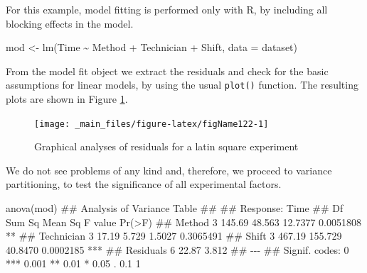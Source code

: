 \documentclass[a4paper,12pt,oneside]{book}
\newenvironment{Shaded}{\begin{snugshade}}{\end{snugshade}}
\newcommand{\SpecialCharTok}[1]{#1}
\newcommand{\DocumentationTok}[1]{#1}
\newcommand{\OtherTok}[1]{#1}
\newcommand{\FunctionTok}[1]{#1}
\newcommand{\AttributeTok}[1]{#1}
\newcommand{\NormalTok}[1]{#1}
\begin{document}
For this example, model fitting is performed only with R, by including all blocking effects in the model.

\begin{Shaded}
\begin{Highlighting}[]
\NormalTok{mod }\OtherTok{\textless{}{-}} \FunctionTok{lm}\NormalTok{(Time }\SpecialCharTok{\textasciitilde{}}\NormalTok{ Method }\SpecialCharTok{+}\NormalTok{ Technician }\SpecialCharTok{+}\NormalTok{ Shift, }\AttributeTok{data =}\NormalTok{ dataset)}
\end{Highlighting}
\end{Shaded}

From the model fit object we extract the residuals and check for the basic assumptions for linear models, by using the usual \texttt{plot()} function. The resulting plots are shown in Figure \ref{fig:figName122}.

\begin{figure}

{\centering \texttt{[image: \_main\_files/figure-latex/figName122-1]} 

}

\caption{Graphical analyses of residuals for a latin square experiment}\label{fig:figName122}
\end{figure}

We do not see problems of any kind and, therefore, we proceed to variance partitioning, to test the significance of all experimental factors.

\begin{Shaded}
\begin{Highlighting}[]
\FunctionTok{anova}\NormalTok{(mod)}
\DocumentationTok{\#\# Analysis of Variance Table}
\DocumentationTok{\#\# }
\DocumentationTok{\#\# Response: Time}
\DocumentationTok{\#\#            Df Sum Sq Mean Sq F value    Pr(\textgreater{}F)    }
\DocumentationTok{\#\# Method      3 145.69  48.563 12.7377 0.0051808 ** }
\DocumentationTok{\#\# Technician  3  17.19   5.729  1.5027 0.3065491    }
\DocumentationTok{\#\# Shift       3 467.19 155.729 40.8470 0.0002185 ***}
\DocumentationTok{\#\# Residuals   6  22.87   3.812                      }
\DocumentationTok{\#\# {-}{-}{-}}
\DocumentationTok{\#\# Signif. codes:  0 \textquotesingle{}***\textquotesingle{} 0.001 \textquotesingle{}**\textquotesingle{} 0.01 \textquotesingle{}*\textquotesingle{} 0.05 \textquotesingle{}.\textquotesingle{} 0.1 \textquotesingle{} \textquotesingle{} 1}
\end{Highlighting}
\end{Shaded}
\end{document}
